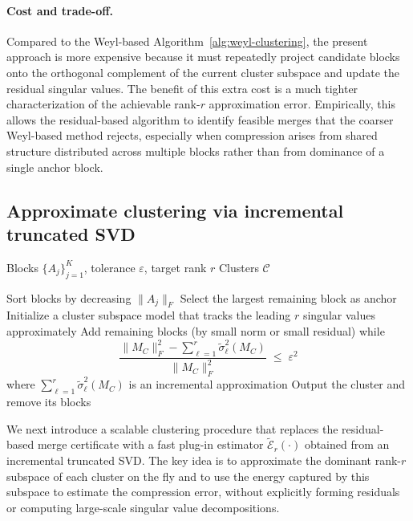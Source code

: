 \documentclass[10pt]{article} %
\begin{document}
\paragraph{Cost and trade-off.}
Compared to the Weyl-based Algorithm~\ref{alg:weyl-clustering}, the present
approach is more expensive because it must repeatedly project candidate blocks
onto the orthogonal complement of the current cluster subspace and update the
residual singular values. The benefit of this extra
cost is a much tighter characterization of the achievable rank-$r$
approximation error. Empirically, this allows the residual-based algorithm to
identify feasible merges that the coarser Weyl-based method rejects, especially
when compression arises from shared structure distributed across multiple
blocks rather than from dominance of a single anchor block.


\subsection{Approximate clustering via incremental truncated SVD}
\label{appendix:algo3}

\begin{algorithm}[t]
\caption{Approximate residual-based clustering}
\label{alg:approx-clustering}
\begin{algorithmic}[1]
\REQUIRE Blocks $\{A_j\}_{j=1}^K$, tolerance $\varepsilon$, target rank $r$
\ENSURE Clusters $\mathcal{C}$

\STATE Sort blocks by decreasing $\|A_j\|_F$
  \STATE Select the largest remaining block as anchor
  \STATE Initialize a cluster subspace model that tracks the leading $r$ singular values approximately
  \STATE Add remaining blocks (by small norm or small residual) while
  \[
    \frac{\|M_C\|_F^2 - \sum_{\ell=1}^r \widetilde{\sigma}_\ell^2(M_C)}
         {\|M_C\|_F^2}
    \;\le\; \varepsilon^2
  \]
  where $\sum_{\ell=1}^r \widetilde{\sigma}_\ell^2(M_C)$ is an incremental approximation
  \STATE Output the cluster and remove its blocks
\ENDWHILE
\end{algorithmic}
\end{algorithm}


We next introduce a scalable clustering procedure that replaces the
residual-based merge certificate with a fast plug-in estimator
$\widetilde{\mathcal{E}}_r(\cdot)$ obtained from an incremental truncated SVD.
The key idea is to approximate the dominant rank-$r$ subspace of each cluster
on the fly and to use the energy captured by this subspace to estimate the
compression error, without explicitly forming residuals or computing
large-scale singular value decompositions.
\end{document}
